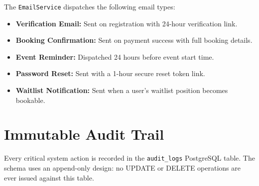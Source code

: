 \documentclass[12pt,a4paper]{report}
\begin{document}
The \texttt{EmailService} dispatches the following email types:
\begin{itemize}[leftmargin=2em]
    \item \textbf{Verification Email:} Sent on registration with 24-hour verification link.
    \item \textbf{Booking Confirmation:} Sent on payment success with full booking details.
    \item \textbf{Event Reminder:} Dispatched 24 hours before event start time.
    \item \textbf{Password Reset:} Sent with a 1-hour secure reset token link.
    \item \textbf{Waitlist Notification:} Sent when a user's waitlist position becomes bookable.
\end{itemize}

\section{Immutable Audit Trail}
Every critical system action is recorded in the \texttt{audit\_logs} PostgreSQL table. The schema uses an append-only design: no UPDATE or DELETE operations are ever issued against this table.
\end{document}

